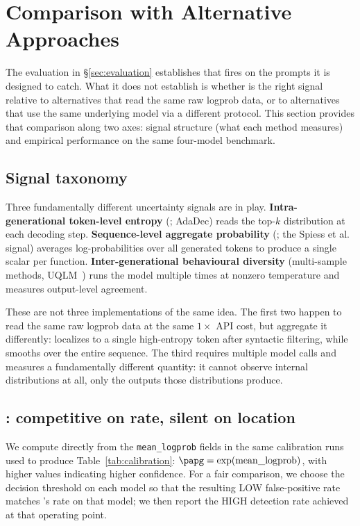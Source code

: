 \section{Comparison with Alternative Approaches}
\label{sec:comparison}

The evaluation in \S\ref{sec:evaluation} establishes that \eps fires on
the prompts it is designed to catch. What it does not establish is
whether \eps is the right signal relative to alternatives that read the
same raw logprob data, or to alternatives that use the same underlying
model via a different protocol. This section provides that comparison
along two axes: signal structure (what each method measures) and
empirical performance on the same four-model benchmark.

\subsection{Signal taxonomy}
\label{subsec:signal-taxonomy}

Three fundamentally different uncertainty signals are in play.
\textbf{Intra-generational token-level entropy} (\eps; AdaDec) reads the
top-$k$ distribution at each decoding step. \textbf{Sequence-level
aggregate probability} (\papg; the Spiess et al.~\cite{spiess2025calibration}
signal) averages log-probabilities over all generated tokens to produce
a single scalar per function. \textbf{Inter-generational behavioural
diversity} (multi-sample methods, UQLM~\cite{uqlm2024}) runs the model
multiple times at nonzero temperature and measures output-level
agreement.

These are not three implementations of the same idea. The first two
happen to read the same raw logprob data at the same $1\times$ API cost,
but aggregate it differently: \eps localizes to a single high-entropy
token after syntactic filtering, while \papg smooths over the entire
sequence. The third requires multiple model calls and measures a
fundamentally different quantity: it cannot observe internal
distributions at all, only the outputs those distributions produce.

\subsection{\papg: competitive on rate, silent on location}
\label{subsec:papg-comp}

We compute \papg directly from the \texttt{mean\_logprob} fields in the
same calibration runs used to produce Table~\ref{tab:calibration}:
$\papg = \exp(\mathrm{mean\_logprob})$, with higher values indicating
higher confidence. For a fair comparison, we choose the \papg decision
threshold on each model so that the resulting LOW false-positive rate
matches \eps's rate on that model; we then report the HIGH detection
rate achieved at that operating point.

